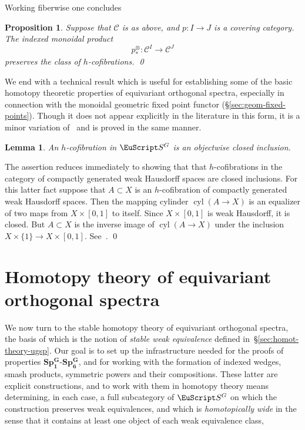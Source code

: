 \documentclass{amsart}
\newtheorem{lem}[equation]{Lemma}
\newtheorem{prop}[equation]{Proposition}
\theoremstyle{definition}
\theoremstyle{remark}
\newenvironment{pf}{\bigskip{\em Proof:\/}}{\qed\medskip}
\newcommand{\spectra}{\EuScript S}
\newcommand{\ugspectra}[1]{\spectra^{#1}}
\newcommand{\cat}[1]{{\mathcal #1}}
\newcommand{\tensorp}[1]{#1^{\otimes}_{\ast}}
\DeclareMathOperator{\cyl}{cyl}
\newcommand{\gswdes}[1]{\mathbf{Sp^{G}_{#1}}}
\begin{document}
Working fiberwise one concludes

\begin{prop}
\label{thm:210}
Suppose that $\cat C$ is as above, and $p:I\to J$ is a covering
category.   The indexed monoidal product 
\[
\tensorp{p}:\cat C^{I}\to \cat C^{J}
\]
preserves the class of $h$-cofibrations.  \qed
\end{prop}

We end with a technical result which is useful for establishing some
of the basic homotopy theoretic properties of equivariant orthogonal
spectra, especially in connection with the monoidal geometric fixed
point functor (\S\ref{sec:geom-fixed-points}).  Though it does not
appear explicitly in the literature in this form, it is a minor
variation of~\cite[Appendix, Proposition~3.9]{LMayS} and is proved in
the same manner.

\begin{lem}
\label{thm:105}
An $h$-cofibration in $\ugspectra{G}$ is an objectwise closed inclusion. 
\end{lem}

\begin{pf}
The assertion reduces immediately to showing that that
$h$-cofibrations in the category of compactly generated weak Hausdorff
spaces are closed inclusions.  For this latter fact suppose that
$A\subset X$ is an $h$-cofibration of compactly generated weak
Hausdorff spaces.  Then the mapping cylinder $\cyl(A\to X)$ is an
equalizer of two maps from $X\times [0,1]$ to itself.  Since $X\times
[0,1]$ is weak Hausdorff, it is closed.  But $A\subset X$ is the
inverse image of $\cyl (A\to X)$ under the inclusion $X\times\{1\}\to
X\times [0,1]$.  See~\cite[Pages~488-9]{LMayS}.  
\end{pf}

\section{Homotopy theory of equivariant orthogonal spectra}
\label{sec:homot-theory-equiv}

We now turn to the stable homotopy theory of equivariant orthogonal
spectra, the basis of which is the notion of {\em stable weak
equivalence} defined in~\S\ref{sec:homot-theory-ugsp}.  Our goal is to
set up the infrastructure needed for the proofs of properties
$\gswdes{1}$-$\gswdes{6}$, and for working with the formation of
indexed wedges, smash products, symmetric powers and their
compositions.  These latter are explicit constructions, and to work
with them in homotopy theory means determining, in each case, a full
subcategory of $\ugspectra{G}$ on which the construction preserves
weak equivalences, and which is {\em homotopically wide} in the sense
that it contains at least one object of each weak equivalence class,
\end{document}
